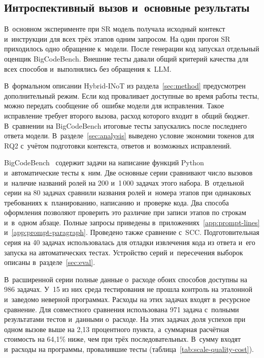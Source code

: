 \subsection{Интроспективный вызов и~основные результаты}
В~основном эксперименте при SR модель получала исходный контекст и~инструкции для всех трёх этапов одним запросом. На один прогон SR приходилось одно обращение к~модели. После генерации код запускал отдельный оценщик BigCodeBench. Внешние тесты давали общий критерий качества для всех способов и~выполнялись без обращения к~LLM.

В~формальном описании Hybrid-INoT из раздела~\ref{sec:method} предусмотрен дополнительный режим. Если код проваливает доступные во время работы тесты, можно передать сообщение об~ошибке модели для исправления. Такое исправление требует второго вызова, расход которого входит в~общий бюджет. В~сравнении на BigCodeBench итоговые тесты запускались после последнего ответа модели. В~разделе~\ref{sec:analysis} выведено условие экономии токенов для RQ2 с~учётом подготовки контекста, ответов и~возможных исправлений.

BigCodeBench~\cite{zhuo2024bigcodebench} содержит задачи на написание функций Python и~автоматические тесты к~ним. Две основные серии сравнивают число вызовов и~наличие названий ролей на 200 и~1\,000 задачах этого набора. В~отдельной серии на 80 задачах сравнили названия ролей и~номера этапов при одинаковых требованиях к~планированию, написанию и~проверке кода. Два способа оформления позволяют проверить это различие при записи этапов по строкам и~в~одном абзаце. Полные запросы приведены в~приложениях~\ref{app:prompt-lines} и~\ref{app:prompt-paragraph}. Проведено также сравнение с~SCC. Подготовительная серия на 40 задачах использовалась для отладки извлечения кода из ответа и~его запуска на автоматических тестах. Устройство серий и~пересечения выборок описаны в~разделе~\ref{sec:eval}.

В~расширенной серии полные данные о~расходе обоих способов доступны на 986 задачах. У~15 из них среда тестирования не прошла контроль на эталонной и~заведомо неверной программах. Расходы на этих задачах входят в~ресурсное сравнение. Для совместного сравнения использована 971 задача с~полными результатами тестов и~данными о~расходе. На этих задачах доля успехов при одном вызове выше на 2,13 процентного пункта, а~суммарная расчётная стоимость на 64,1\% ниже, чем при трёх последовательных. В~сумму входят и~расходы на программы, провалившие тесты (таблица~\ref{tab:scale-quality-cost}).

